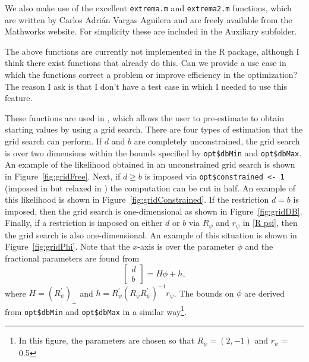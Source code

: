 \documentclass[article]{jss}
\newcommand{\fct}[1]{\code{#1()}}
\begin{document}
We also make use of the excellent \verb|extrema.m| and \verb|extrema2.m| functions, which are written by Carlos Adrián Vargas Aguilera and are freely available from the Mathworks website. For simplicity these are included in the Auxiliary subfolder.

\begin{leftbar}
The above functions are currently not implemented in the R package, although I think there exist functions that already do this. 
Can we provide a use case in which the functions correct a problem or improve efficiency in the optimization?
The reason I ask is that I don't have a test case in which I needed to use this feature. 
\end{leftbar}

These functions are used in \fct{FCVARlikeGrid}, which allows the user to pre-estimate to obtain starting values by using a grid search. There are four types of estimation that the grid search can perform. If $d$ and $b$ are completely unconstrained, the grid search is over two dimensions within the bounds specified by \verb|opt$dbMin| and \verb|opt$dbMax|. An example of the likelihood obtained in an unconstrained grid search is shown in Figure~\ref{fig:gridFree}. Next, if $d\ge b$ is imposed via \verb|opt$constrained <- 1| (imposed in \cite{johansen2012likelihood} but relaxed in \cite{JN2018}) the computation can be cut in half. An example of this likelihood is shown in Figure~\ref{fig:gridConstrained}. If the restriction $d=b$ is imposed, then the grid search is one-dimensional as shown in Figure~\ref{fig:gridDB}. Finally, if a restriction is imposed on either $d$ or $b$ via $R_\psi$ and $r_\psi$ in \eqref{R psi}, then the grid search is also one-dimensional. An example of this situation is shown in Figure~\ref{fig:gridPhi}. Note that the $x$-axis is over the parameter $\phi$ and the fractional parameters are found from
\begin{equation}
  \begin{bmatrix}
    d \\ b
  \end{bmatrix}
  = H\phi + h,
\end{equation}
where $H = (R_{\psi}^{\prime})_\perp$ and $h = R_{\psi}^{\prime} (R_\psi R_{\psi}^{\prime})^{-1} r_\psi$. The bounds on $\phi$ are derived from \verb|opt$dbMin| and \verb|opt$dbMax| in a similar way\footnote{In this figure, the parameters are chosen so that $R_{\psi} = (2, -1)$ and $r_\psi$ = 0.5}.
\end{document}
